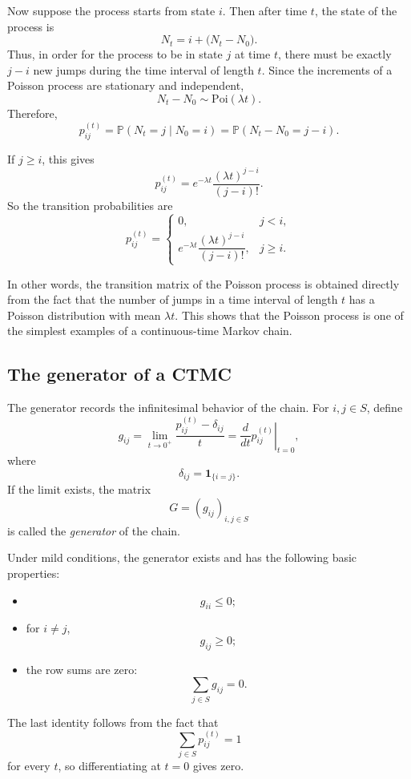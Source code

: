 \documentclass[11pt]{article}
\theoremstyle{definition}
\begin{document}
Now suppose the process starts from state \(i\). Then after time \(t\), the state of the process is
\[
N_t=i+\bigl(N_t-N_0\bigr).
\]
Thus, in order for the process to be in state \(j\) at time \(t\), there must be exactly \(j-i\) new jumps during the time interval of length \(t\). Since the increments of a Poisson process are stationary and independent,
\[
N_t-N_0\sim \mathrm{Poi}(\lambda t).
\]
Therefore,
\[
p_{ij}^{(t)}
=
\mathbb P(N_t=j\mid N_0=i)
=
\mathbb P(N_t-N_0=j-i).
\]

If \(j\ge i\), this gives
\[
p_{ij}^{(t)}
=
e^{-\lambda t}\frac{(\lambda t)^{j-i}}{(j-i)!}.
\]
So the transition probabilities are
\[
p_{ij}^{(t)}=
\begin{cases}
0, & j<i,\\[6pt]
e^{-\lambda t}\dfrac{(\lambda t)^{j-i}}{(j-i)!}, & j\ge i.
\end{cases}
\]

In other words, the transition matrix of the Poisson process is obtained directly from the fact that the number of jumps in a time interval of length \(t\) has a Poisson distribution with mean \(\lambda t\). This shows that the Poisson process is one of the simplest examples of a continuous-time Markov chain.

\subsection{The generator of a CTMC}

The generator records the infinitesimal behavior of the chain.
For $i,j\in S$, define
\[
g_{ij}
=
\lim_{t\to 0^+}\frac{p_{ij}^{(t)}-\delta_{ij}}{t}
=
\left.\frac{d}{dt}p_{ij}^{(t)}\right|_{t=0},
\]
where
\[
\delta_{ij}=\mathbf 1_{\{i=j\}}.
\]
If the limit exists, the matrix
\[
G=(g_{ij})_{i,j\in S}
\]
is called the \emph{generator} of the chain.

Under mild conditions, the generator exists and has the following basic properties:
\begin{itemize}[leftmargin=2em]
    \item
    \[
    g_{ii}\le 0;
    \]
    \item for $i\ne j$,
    \[
    g_{ij}\ge 0;
    \]
    \item the row sums are zero:
    \[
    \sum_{j\in S} g_{ij}=0.
    \]
\end{itemize}

The last identity follows from the fact that
\[
\sum_{j\in S} p_{ij}^{(t)}=1
\]
for every $t$, so differentiating at $t=0$ gives zero.
\end{document}
